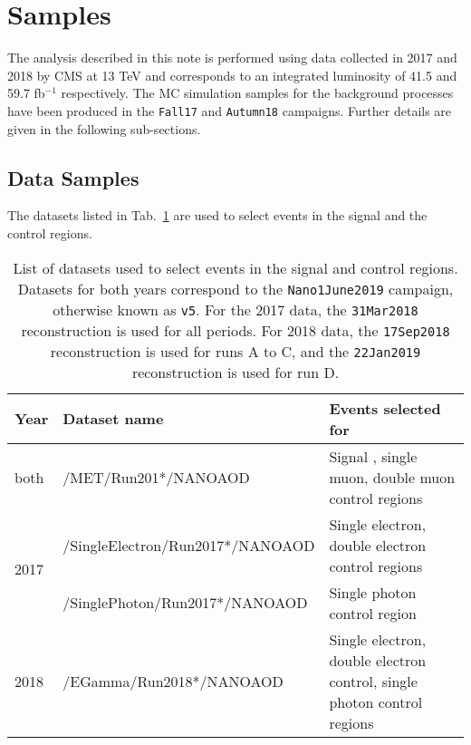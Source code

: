 \section{Samples} \label{sec:samples}

The analysis described in this note is performed using data collected in 2017 and 2018 by
CMS at 13 TeV and corresponds to an integrated luminosity of 41.5 and 59.7 fb$^{-1}$ respectively.
The MC simulation samples for the background processes
have been produced in the \texttt{Fall17} and \texttt{Autumn18} campaigns. Further details
are given in the following sub-sections.

\subsection{Data Samples}

The datasets listed in Tab.~\ref{tab:DataSamples} are used to
select events in the signal and the control regions.

\begin{table}[ht!]
    \centering
    \small
    \def\arraystretch{1.5}
    \caption{List of datasets used to select events in the signal and control regions. Datasets for both years correspond to the \texttt{Nano1June2019} campaign, otherwise known as \texttt{v5}. For the 2017 data, the \texttt{31Mar2018} reconstruction is used for all periods. For 2018 data, the \texttt{17Sep2018} reconstruction is used for runs A to C, and the \texttt{22Jan2019} reconstruction is used for run D.}
    \begin{tabular}{l l p{8cm}}
        \hline
        \hline
        Year                  & Dataset name                       & Events selected for                                                     \\
        \hline
        \hline
        both                  & {/MET/Run201*/NANOAOD}             & Signal , single muon, double muon control regions                 \\\hline
        \multirow{2}{*}{2017} & {/SingleElectron/Run2017*/NANOAOD} & Single electron, double electron control regions                        \\
                              & {/SinglePhoton/Run2017*/NANOAOD}   & Single photon control region                                            \\\hline
        2018                  & {/EGamma/Run2018*/NANOAOD}         & Single electron, double electron control, single photon control regions \\
        \hline
        \hline
    \end{tabular}

    \label{tab:DataSamples}
\end{table}


